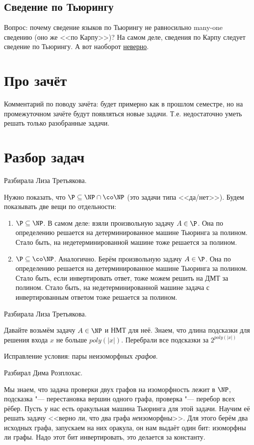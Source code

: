 \subsection{Сведение по Тьюрингу}
	Вопрос: почему сведение языков по Тьюрингу не равносильно many-one сведению (оно же <<по Карпу>>)?
	На самом деле, сведения по Карпу следует сведение по Тьюрингу.
	А вот наоборот \hyperref[task_14_rem_turing]{неверно}.

\section{Про зачёт}
	Комментарий по поводу зачёта: будет примерно как в прошлом семестре, но на промежуточном
	зачёте будут появляться новые задачи.
	Т.е. недостаточно уметь решать только разобранные задачи.

\section{Разбор задач}
	Разбирала Лиза Третьякова.

	Нужно показать, что $\P \subseteq \NP \cap \co\NP$ (это задачи типа <<да/нет>>).
	Будем показывать две вещи по отдельности:
	\begin{enumerate}
		\item
			$\P \subseteq \NP$.
			В самом деле: взяли произвольную задачу $A \in \P$.
			Она по определению решается на детерминированное машине Тьюринга за полином.
			Стало быть, на недетерминированной машине тоже решается за полином.
		\item
			$\P \subseteq \co\NP$.
			Аналогично.
			Берём произвольную задачу $A \in \P$.
			Она по определению решается на детерминированное машине Тьюринга за полином.
			Стало быть, если инвертировать ответ, тоже можем решить на ДМТ за полином.
			Стало быть, на недетерминированной машине задача с инвертированным ответом тоже решается за полином.
	\end{enumerate}

	Разбирала Лиза Третьякова.

	Давайте возьмём задачу $A \in \NP$ и НМТ для неё.
	Знаем, что длина подсказки для решения входа $x$ не больше $poly(|x|)$.
	Перебрали все подсказки за $2^{poly(|x|)}$

	Исправление условия: пары неизоморфных \textit{графов}.

	Разбирал Дима Розплохас.

	Мы знаем, что задача проверки двух графов на изоморфность лежит в $\NP$,
	подсказка "--- перестановка вершин одного графа, проверка "--- перебор всех рёбер.
	Пусть у нас есть оракульная машина Тьюринга для этой задачи.
	Научим её решать задачу <<верно ли, что два графа \textit{не}изоморфны>>.
	Для этого берём два исходных графа, запускаем на них оракула, он нам выдаёт
	один бит: изоморфны ли графы.
	Надо этот бит инвертировать, это делается за константу.

